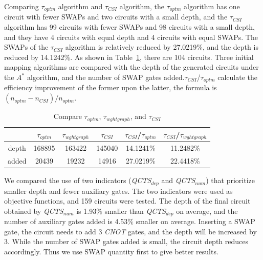 \documentclass[runningheads]{llncs}
\begin{document}
Comparing $\tau_{optm}$ algorithm and $\tau_{CSI}$ algorithm, the $\tau_{optm}$ algorithm has one circuit with fewer SWAPs and two circuits with a small depth, and the $\tau_{CSI}$ algorithm has 99 circuits with fewer SWAPs and 98 circuits with a small depth, 
and they have 4 circuits with equal depth and 4 circuits with equal SWAPs. The SWAPs of the $\tau_{CSI}$ algorithm is relatively reduced by 27.0219\%, and the depth is reduced by 14.1242\%. As shown in Table~\ref{tab1}, there are 104 circuits. Three initial mapping algorithms are compared with the depth of the generated circuits under the $A^{*}$ algorithm, and the number of SWAP gates added.$\tau_{CSI}$/$\tau_{optm}$  calculate the efficiency improvement of the former upon the latter, the formula is $(n_{optm}-n_{CSI})/n_{optm}$.
\begin{table}
	\begin{center}  
	\begin{tabular}{|c|c|c|c|c|c|}
	\hline
	    	&  $\tau_{optm}$ & $\tau_{wghtgraph}$ &$\tau_{CSI}$& $\tau_{CSI}$/$\tau_{optm}$ & $\tau_{CSI}$/$\tau_{wghtgraph}$\\
	\hline
	 depth 	 &	168895	&   163422	&  145040 	& 14.1241\%  &11.2482\%   \\
	\hline
	 added 	&	20439	&  19232 	&  14916 & 27.0219\% 	&  22.4418\%  \\
	\hline
	\end{tabular} 
	\end{center} 
	\caption{Compare $\tau_{optm}$, $\tau_{wghtgraph}$, and $\tau_{CSI}$ }
	\label{tab1}
	\end{table}

	We compared the use of two indicators (\textit{QCTS$_{dep}$} and \textit{QCTS$_{num}$}) that prioritize smaller depth and fewer auxiliary gates. The two indicators were used as objective functions, and 159 circuits were tested. The depth of the final circuit obtained by \textit{QCTS$_{num}$} is 1.93\% smaller than \textit{QCTS$_{dep}$} on average, and the number of auxiliary gates added is 4.53\% smaller on average. Inserting a SWAP gate, the circuit needs to add 3 \textit{CNOT} gates, and the depth will be increased by 3. While the number of SWAP gates added is small, the circuit depth reduces accordingly. Thus we use SWAP quantity first to give better results. 
\end{document}
